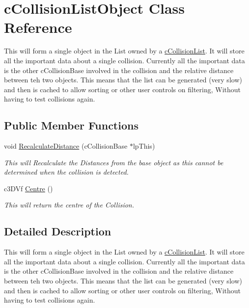 \hypertarget{classc_collision_list_object}{
\section{cCollisionListObject Class Reference}
\label{classc_collision_list_object}
}


This will form a single object in the List owned by a \hyperlink{classc_collision_list}{cCollisionList}. It will store all the important data about a single collision. Currently all the important data is the other cCollisionBase involved in the collision and the relative distance between teh two objects. This means that the list can be generated (very slow) and then is cached to allow sorting or other user controls on filtering, Without having to test collisions again.  


\subsection*{Public Member Functions}
\begin{DoxyCompactItemize}
\item 
\hypertarget{classc_collision_list_object_ad469b6e0f98587c64cb2c74c1020ca61}{
void \hyperlink{classc_collision_list_object_ad469b6e0f98587c64cb2c74c1020ca61}{RecalculateDistance} (cCollisionBase $\ast$lpThis)}
\label{classc_collision_list_object_ad469b6e0f98587c64cb2c74c1020ca61}

\begin{DoxyCompactList}\small\item\em This will Recalculate the Distances from the base object as this cannot be determined when the collision is detected. \end{DoxyCompactList}\item 
\hypertarget{classc_collision_list_object_a760a3e6b5627e5afe233291bda0e8909}{
c3DVf \hyperlink{classc_collision_list_object_a760a3e6b5627e5afe233291bda0e8909}{Centre} ()}
\label{classc_collision_list_object_a760a3e6b5627e5afe233291bda0e8909}

\begin{DoxyCompactList}\small\item\em This will return the centre of the Collision. \end{DoxyCompactList}\end{DoxyCompactItemize}


\subsection{Detailed Description}
This will form a single object in the List owned by a \hyperlink{classc_collision_list}{cCollisionList}. It will store all the important data about a single collision. Currently all the important data is the other cCollisionBase involved in the collision and the relative distance between teh two objects. This means that the list can be generated (very slow) and then is cached to allow sorting or other user controls on filtering, Without having to test collisions again. 